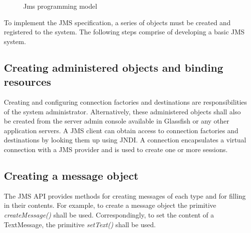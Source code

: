 \documentclass[9pt,twocolumn,twoside]{../../styles/osajnl}
\begin{document}
\begin{figure}[htbp]
\centering
{}
\caption{Jms programming model \cite{www-jms-fischli-article}}
\label{fig:JMS Programming Objects}
\end{figure}

To implement the JMS specification, a series of objects must be
created and registered to the system. The following steps comprise of
developing a basic JMS system.

\subsection{Creating administered objects and binding resources}

Creating and configuring connection factories and destinations are
responsibilities of the system administrator. Alternatively, these
administered objects shall also be created from the server admin
console available in Glassfish or any other application servers.  A
JMS client can obtain access to connection factories and destinations
by looking them up using JNDI.
A connection encapsulates a virtual connection with a JMS provider
and is used to create one or more sessions.

\subsection{Creating a message object}

The JMS API provides methods for creating messages of each type and
for filling in their contents. For example, to create a message object
the primitive \emph{createMessage()} shall be used. Correspondingly, to
set the content of a TextMessage, the primitive \emph{setText()} shall
be used.
\end{document}
